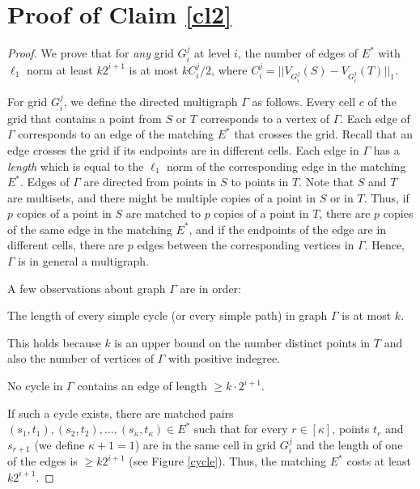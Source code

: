 \documentclass[oribibl]{llncs}
\begin{document}
\appendix
\section{Proof of Claim \ref{cl2}}
\begin{proof}
We prove that for \textit{any} grid $G^j_i$ at level $i$, the number of
edges of $E^*$ with $\ell_1$ norm at least $k2^{i+1}$ is at most $kC_i^j/2$,
where $C_i^j = ||V_{G_i^j}(S)-V_{G_i^j}(T)||_1$.

For grid $G_i^j$, we define the directed multigraph $\Gamma$ as follows. Every
cell $c$ of the grid that contains a point from $S$ or $T$ corresponds to a
vertex of $\Gamma$.
Each edge of $\Gamma$ corresponds to an edge of the matching $E^*$ that crosses
the grid. Recall that an edge crosses the grid if its endpoints are in different
cells. Each edge in $\Gamma$ has a \textit{length} which is equal to the
$\ell_1$ norm of the corresponding edge in the matching $E^*$.
Edges of $\Gamma$ are directed from points in $S$ to points in
$T$. Note that $S$ and $T$ are multisets, and there might be multiple copies of
a point in $S$ or in $T$.
Thus, if $p$ copies of a point in $S$ are matched to
$p$ copies of a point in $T$, there are $p$ copies of the same edge in the
matching $E^*$, and if the endpoints of the edge are in different cells,
there are $p$ edges between the corresponding vertices in $\Gamma$. Hence,
$\Gamma$ is in general a multigraph.

A few observations about graph $\Gamma$ are in order:
\begin{observation}\label{obs1}
 The length of every simple cycle (or every simple path) in graph $\Gamma$
is at most $k$.
\end{observation}
This holds because $k$ is an upper bound on the number distinct points in $T$
and also the number of vertices of $\Gamma$ with positive indegree.
\begin{observation}\label{obs2}
No cycle in $\Gamma$ contains an edge of length $\ge k\cdot2^{i+1}$. 
\end{observation}
If such a cycle exists, there are
matched pairs 
$(s_1,t_1),(s_2,t_2), \ldots, (s_\kappa, t_\kappa)\in E^*$ such that
for every $r\in[\kappa]$, points $t_r$ and $s_{r+1}$
(we define $\kappa + 1 = 1$) are in the same cell in grid $G_i^j$
and the length of one of the edges is $\ge k2^{i+1}$
(see Figure \ref{cycle}).
Thus, the matching $E^*$ costs at least $k2^{i+1}$.



\end{proof}
\end{document}
